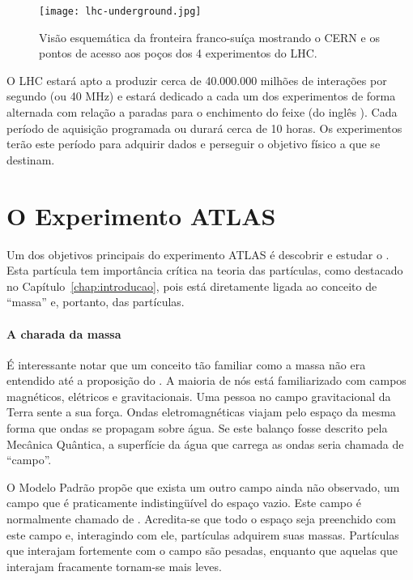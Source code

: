 \begin{figure}
\begin{center}
\texttt{[image: lhc-underground.jpg]}
\end{center}
\caption{Visão esquemática da fronteira franco-suíça mostrando o CERN e os
pontos de acesso aos poços dos 4 experimentos do LHC.}
\label{fig:aerial}
\end{figure}

O LHC estará apto a produzir cerca de 40.000.000 milhões de interações por
segundo (ou 40 MHz) e estará dedicado a cada um dos experimentos de forma
alternada com relação a paradas para o enchimento do feixe (do inglês
). Cada período de aquisição programada ou  durará
cerca de 10 horas. Os experimentos terão este período para adquirir dados e
perseguir o objetivo físico a que se destinam.

\section{O Experimento ATLAS}

Um dos objetivos principais do experimento ATLAS é descobrir e estudar o
. Esta partícula tem importância crítica na teoria das
partículas, como destacado no Capítulo~\ref{chap:introducao}, pois está
diretamente ligada ao conceito de ``massa'' e,
portanto, das partículas.

\paragraph{A charada da massa} É interessante notar que um conceito tão
familiar como a massa não era entendido até a proposição do . A maioria de nós está familiarizado com campos magnéticos, elétricos
e gravitacionais. Uma pessoa no campo gravitacional da Terra sente a sua
força. Ondas eletromagnéticas viajam pelo espaço da mesma forma que ondas
se propagam sobre água. Se este balanço fosse descrito pela Mecânica Quântica,
a superfície da água que carrega as ondas seria chamada de ``campo''.

O Modelo Padrão propõe que exista um outro campo ainda não observado, um campo
que é praticamente indistingüível do espaço vazio. Este campo é normalmente
chamado de . Acredita-se que todo o espaço seja preenchido
com este campo e, interagindo com ele, partículas adquirem suas
massas. Partículas que interajam fortemente com o campo são pesadas, enquanto
que aquelas que interajam fracamente tornam-se mais leves.

